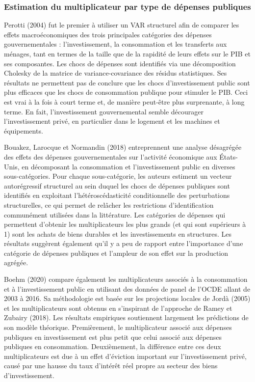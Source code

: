 \documentclass[12pt,letterpaper]{article}
\begin{document}
\subsubsection{Estimation du multiplicateur par type de dépenses publiques}

Perotti (2004) fut le premier à utiliser un VAR structurel afin de comparer les effets macroéconomiques des trois principales catégories des dépenses gouvernementales : l'investissement, la consommation et les transferts aux ménages, tant en termes de la taille que de la rapidité de leurs effets sur le PIB et ses composantes. Les chocs de dépenses sont identifiés via une décomposition Cholesky de la matrice de variance-covariance des résidus statistiques. Ses résultats ne permettent pas de conclure que les chocs d'investissement public sont plus efficaces que les chocs de consommation publique pour stimuler le PIB. Ceci est vrai à la fois à court terme et, de manière peut-être plus surprenante, à long terme. En fait, l'investissement gouvernemental semble décourager l'investissement privé, en particulier dans le logement et les machines et équipements.

Bouakez, Larocque et Normandin (2018) entreprennent une analyse désagrégée des effets des dépenses gouvernementales sur l’activité économique aux États-Unis, en décomposant la consommation et l’investissement public en diverses sous-catégories. Pour chaque sous-catégorie, les auteurs estiment un vecteur autorégressif structurel au sein duquel les chocs de dépenses publiques sont identifiés en exploitant l’hétéroscédasticité conditionnelle des perturbations structurelles, ce qui permet de relâcher les restrictions d’identification communément utilisées dans la littérature. Les catégories de dépenses qui permettent d’obtenir les multiplicateurs les plus grands (et qui sont supérieurs à 1) sont les achats de biens durables et les investissements en structures. Les résultats suggèrent également qu’il y a peu de rapport entre l’importance d’une catégorie de dépenses publiques et l’ampleur de son effet sur la production agrégée.

Boehm (2020) compare également les multiplicateurs associés à la consommation et à l’investissement public en utilisant des données de panel de l’OCDE allant de 2003 à 2016. Sa méthodologie est basée sur les projections locales de Jordà (2005) et les multiplicateurs sont obtenus en s’inspirant de l’approche de Ramey et Zubairy (2018). Les résultats empiriques soutiennent largement les prédictions de son modèle théorique. Premièrement, le multiplicateur associé aux dépenses publiques en investissement est plus petit que celui associé aux dépenses publiques en consommation. Deuxièmement, la différence entre ces deux multiplicateurs est due à un effet d’éviction important sur l'investissement privé, causé par une hausse du taux d'intérêt réel propre au secteur des biens d'investissement.
\end{document}
